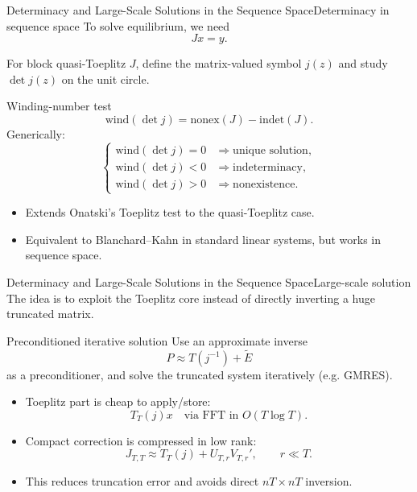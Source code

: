 \documentclass[aspectratio=169]{beamer}
\begin{document}
\begin{frame}{Determinacy and Large-Scale Solutions in the Sequence Space}{Determinacy in sequence space}
\small
To solve equilibrium, we need
\[
Jx = y.
\]

For block quasi-Toeplitz $J$, define the matrix-valued symbol $j(z)$ and study $\det j(z)$ on the unit circle.

\begin{block}{Winding-number test}
\[
\mathrm{wind}(\det j)
=
\mathrm{nonex}(J)-\mathrm{indet}(J).
\]
Generically:
\[
\begin{cases}
\mathrm{wind}(\det j)=0 &\Rightarrow \text{unique solution},\\
\mathrm{wind}(\det j)<0 &\Rightarrow \text{indeterminacy},\\
\mathrm{wind}(\det j)>0 &\Rightarrow \text{nonexistence}.
\end{cases}
\]
\end{block}

\begin{itemize}
    \item Extends Onatski's Toeplitz test to the \alert{quasi-Toeplitz} case.
    \item Equivalent to Blanchard--Kahn in standard linear systems,
    but works \alert{in sequence space}.
\end{itemize}
\end{frame}

\begin{frame}{Determinacy and Large-Scale Solutions in the Sequence Space}{Large-scale solution}
\small
The idea is to exploit the Toeplitz core instead of directly inverting a huge truncated matrix.

\begin{block}{Preconditioned iterative solution}
Use an approximate inverse
\[
P \approx T(j^{-1})+\widetilde E
\]
as a preconditioner, and solve the truncated system iteratively (e.g. GMRES).
\end{block}

\begin{itemize}
    \item Toeplitz part is cheap to apply/store:
    \[
    T_T(j)x \quad \text{via FFT in } O(T\log T).
    \]
    \item Compact correction is compressed in low rank:
    \[
    J_{T,T}\approx T_T(j)+U_{T,r}V_{T,r}' ,\qquad r\ll T.
    \]
    \item This reduces truncation error and avoids direct $nT\times nT$ inversion.
\end{itemize}

\end{frame}
\end{document}
